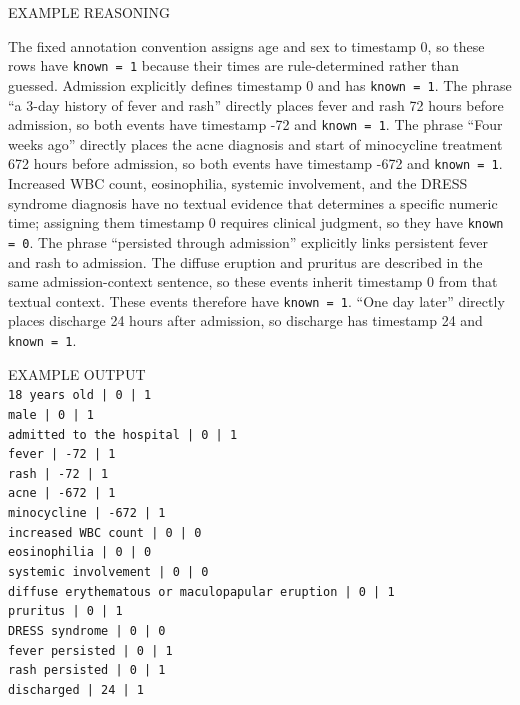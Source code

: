 \begin{tcolorbox}
EXAMPLE REASONING


The fixed annotation convention assigns age and sex to timestamp 0, so these rows have \texttt{known = 1} because their times are rule-determined rather than guessed. Admission explicitly defines timestamp 0 and has \texttt{known = 1}. The phrase ``a 3-day history of fever and rash'' directly places fever and rash 72 hours before admission, so both events have timestamp -72 and \texttt{known = 1}. The phrase ``Four weeks ago'' directly places the acne diagnosis and start of minocycline treatment 672 hours before admission, so both events have timestamp -672 and \texttt{known = 1}. Increased WBC count, eosinophilia, systemic involvement, and the DRESS syndrome diagnosis have no textual evidence that determines a specific numeric time; assigning them timestamp 0 requires clinical judgment, so they have \texttt{known = 0}. The phrase ``persisted through admission'' explicitly links persistent fever and rash to admission. The diffuse eruption and pruritus are described in the same admission-context sentence, so these events inherit timestamp 0 from that textual context. These events therefore have \texttt{known = 1}. ``One day later'' directly places discharge 24 hours after admission, so discharge has timestamp 24 and \texttt{known = 1}.


EXAMPLE OUTPUT\\


\texttt{18 years old | 0 | 1} \\
\texttt{male | 0 | 1} \\
\texttt{admitted to the hospital | 0 | 1} \\
\texttt{fever | -72 | 1} \\
\texttt{rash | -72 | 1} \\
\texttt{acne | -672 | 1} \\
\texttt{minocycline | -672 | 1} \\
\texttt{increased WBC count | 0 | 0} \\
\texttt{eosinophilia | 0 | 0} \\
\texttt{systemic involvement | 0 | 0} \\
\texttt{diffuse erythematous or maculopapular eruption | 0 | 1} \\
\texttt{pruritus | 0 | 1} \\
\texttt{DRESS syndrome | 0 | 0} \\
\texttt{fever persisted | 0 | 1} \\
\texttt{rash persisted | 0 | 1} \\
\texttt{discharged | 24 | 1} \\



\end{tcolorbox}
